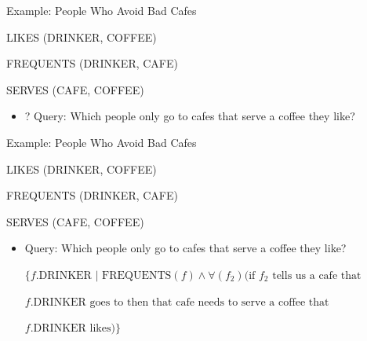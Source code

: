 \documentclass[aspectratio=169]{beamer}
\newenvironment{noindentitemize}
{ \begin{itemize}
 \setlength{\itemsep}{1.5ex}
  \setlength{\parsep}{0pt}   
  \setlength{\parskip}{0pt}
 \addtolength{\leftskip}{-2em}
 }
{ \end{itemize} }
\begin{document}
\begin{frame}{Example: People Who Avoid Bad Cafes}

LIKES (DRINKER, COFFEE)

FREQUENTS (DRINKER, CAFE)

SERVES (CAFE, COFFEE)

\begin{noindentitemize}
\item[?] Query: Which people only go to cafes that serve a coffee they like?
\end{noindentitemize}
\end{frame}


\begin{frame}{Example: People Who Avoid Bad Cafes}

LIKES (DRINKER, COFFEE)

FREQUENTS (DRINKER, CAFE)

SERVES (CAFE, COFFEE)

\begin{noindentitemize}
\item Query: Which people only go to cafes that serve a coffee they like?

\vspace{10 pt}
$\{f.\textrm{DRINKER } | \textrm{ FREQUENTS}(f) \wedge \forall(f_2)(\textrm{if } f_2 \textrm{ tells us a cafe that }$

\hspace{2em}$f.\textrm{DRINKER goes to then that cafe needs to serve a coffee that}$
 
\hspace{2em}$f.\textrm{DRINKER likes})\}$
\end{noindentitemize}
\end{frame}
\end{document}
